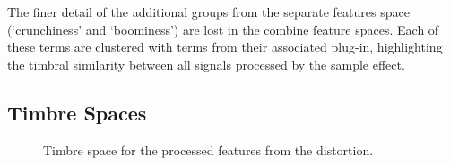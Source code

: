 		The finer detail of the additional groups from the separate features space (`crunchiness' and `boominess')
		are lost in the combine feature spaces. Each of these terms are clustered with terms from their associated
		plug-in, highlighting the timbral similarity between all signals processed by the sample effect.

	\subsection{Timbre Spaces}
	\label{sec:TImbreEvaluation-Analysis-TimbreSpaces}

		\begin{figure}[h!]
			\centering
			\qquad
			\caption{Timbre space for the processed features from the distortion.}
			\label{fig:DistortionProcessedMDSs}
		\end{figure}


